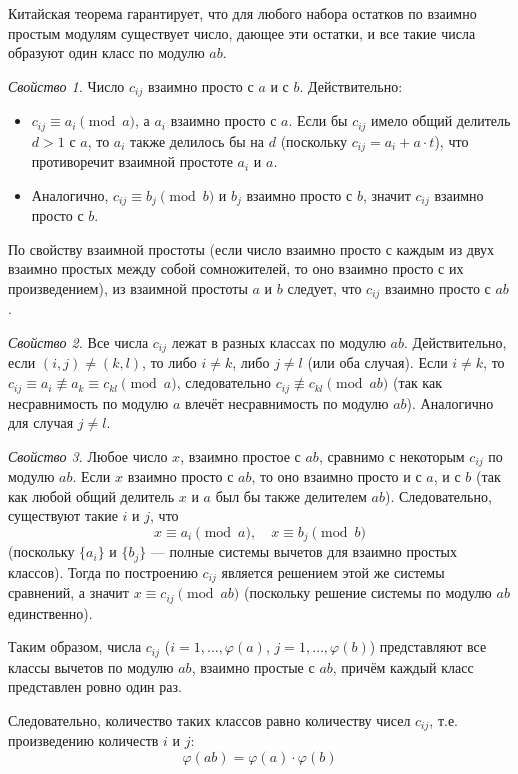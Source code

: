 \documentclass[a4paper,12pt]{article}
\theoremstyle{definition}
\theoremstyle{plain}
\theoremstyle{remark}
\begin{document}
	\begin{tcolorbox}[colback=green!5, colframe=green!50!black, title=Пояснение]
		Китайская теорема гарантирует, что для любого набора остатков по взаимно простым модулям существует число, дающее эти остатки, и все такие числа образуют один класс по модулю $ab$.
	\end{tcolorbox}
	
	\medskip
	\textit{Свойство 1.} Число $c_{ij}$ взаимно просто с $a$ и с $b$.
	Действительно:
	\begin{itemize}
		\item $c_{ij} \equiv a_i \pmod{a}$, а $a_i$ взаимно просто с $a$. Если бы $c_{ij}$ имело общий делитель $d > 1$ с $a$, то $a_i$ также делилось бы на $d$ (поскольку $c_{ij} = a_i + a \cdot t$), что противоречит взаимной простоте $a_i$ и $a$.
		\item Аналогично, $c_{ij} \equiv b_j \pmod{b}$ и $b_j$ взаимно просто с $b$, значит $c_{ij}$ взаимно просто с $b$.
	\end{itemize}
	
	По свойству взаимной простоты (если число взаимно просто с каждым из двух взаимно простых между собой сомножителей, то оно взаимно просто с их произведением), из взаимной простоты $a$ и $b$ следует, что $c_{ij}$ взаимно просто с $ab$.
	
	\textit{Свойство 2.} Все числа $c_{ij}$ лежат в разных классах по модулю $ab$.
	Действительно, если $(i,j) \neq (k,l)$, то либо $i \neq k$, либо $j \neq l$ (или оба случая). Если $i \neq k$, то $c_{ij} \equiv a_i \not\equiv a_k \equiv c_{kl} \pmod{a}$, следовательно $c_{ij} \not\equiv c_{kl} \pmod{ab}$ (так как несравнимость по модулю $a$ влечёт несравнимость по модулю $ab$). Аналогично для случая $j \neq l$.
	
	\textit{Свойство 3.} Любое число $x$, взаимно простое с $ab$, сравнимо с некоторым $c_{ij}$ по модулю $ab$.
	Если $x$ взаимно просто с $ab$, то оно взаимно просто и с $a$, и с $b$ (так как любой общий делитель $x$ и $a$ был бы также делителем $ab$). Следовательно, существуют такие $i$ и $j$, что
	\[
	x \equiv a_i \pmod{a}, \quad x \equiv b_j \pmod{b}
	\]
	(поскольку $\{a_i\}$ и $\{b_j\}$ — полные системы вычетов для взаимно простых классов). Тогда по построению $c_{ij}$ является решением этой же системы сравнений, а значит $x \equiv c_{ij} \pmod{ab}$ (поскольку решение системы по модулю $ab$ единственно).
	
		
	\begin{tcolorbox}[colback=blue!5, colframe=blue!40!black, title=Итог]
		Таким образом, числа $c_{ij}$ ($i = 1,\dots,\varphi(a)$, $j = 1,\dots,\varphi(b)$) представляют все классы вычетов по модулю $ab$, взаимно простые с $ab$, причём каждый класс представлен ровно один раз.
		
		Следовательно, количество таких классов равно количеству чисел $c_{ij}$, т.е. произведению количеств $i$ и $j$:
		\[
		\varphi(ab) = \varphi(a) \cdot \varphi(b)
		\]
	\end{tcolorbox}
	
\end{document}
